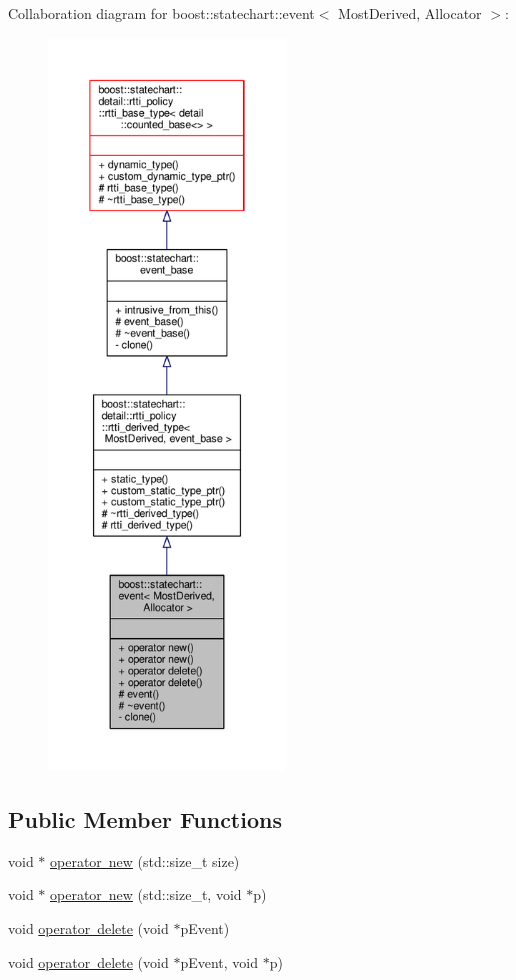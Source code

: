 Collaboration diagram for boost\+:\+:statechart\+:\+:event$<$ Most\+Derived, Allocator $>$\+:
\nopagebreak
\begin{figure}[H]
\begin{center}
\leavevmode
\includegraphics[height=550pt]{classboost_1_1statechart_1_1event__coll__graph}
\end{center}
\end{figure}
\subsection*{Public Member Functions}
\begin{DoxyCompactItemize}
\item 
void $\ast$ \mbox{\hyperlink{classboost_1_1statechart_1_1event_a53303aa51b8185e92cdd296ddef99317}{operator new}} (std\+::size\+\_\+t size)
\item 
void $\ast$ \mbox{\hyperlink{classboost_1_1statechart_1_1event_a5a96b4dd856bbb827654fcec0924569c}{operator new}} (std\+::size\+\_\+t, void $\ast$p)
\item 
void \mbox{\hyperlink{classboost_1_1statechart_1_1event_a3e373d9f7d6da95d5ce091f94ecb8bcb}{operator delete}} (void $\ast$p\+Event)
\item 
void \mbox{\hyperlink{classboost_1_1statechart_1_1event_aab40cf2303a7ffb4ba3b4dcbb33ba1a4}{operator delete}} (void $\ast$p\+Event, void $\ast$p)
\end{DoxyCompactItemize}
